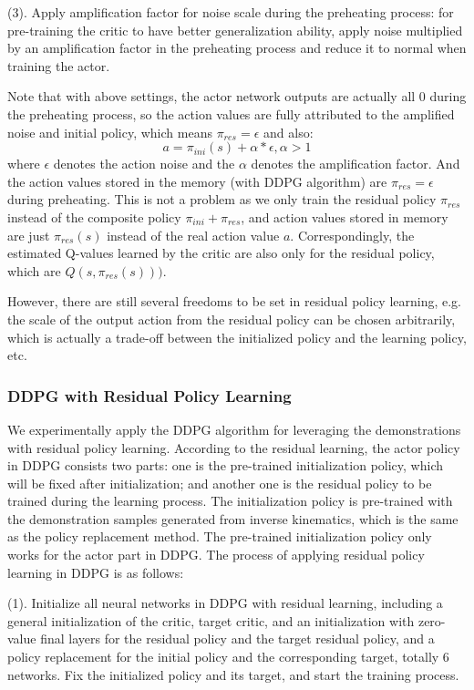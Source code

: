 \documentclass{article}
\begin{document}
(3). Apply amplification factor for noise scale during the preheating process: for pre-training the critic to have better generalization ability, apply noise multiplied by an amplification factor in the preheating process and reduce it to normal when training the actor.

Note that with above settings, the actor network outputs are actually all 0 during the preheating process, so the action values are fully attributed to the amplified noise and initial policy, which means $\pi_{res}=\epsilon$ and also:
\begin{equation}
a=\pi_{ini}(s)+\alpha * \epsilon, \alpha>1
\end{equation}
where $\epsilon$ denotes the action noise and the $\alpha$ denotes the amplification factor. And the action values stored in the memory (with DDPG algorithm) are $\pi_{res}=\epsilon$ during preheating. This is not a problem as we only train the residual policy $\pi_{res}$ instead of the composite policy $\pi_{ini}+\pi_{res}$, and action values stored in memory are just $\pi_{res}(s)$ instead of the real action value $a$. Correspondingly, the estimated Q-values learned by the critic are also only for the residual policy, which are $Q(s, \pi_{res}(s)))$.

However, there are still several freedoms to be set in residual policy learning, e.g. the scale of the output action from the residual policy can be chosen arbitrarily, which is actually a trade-off between the initialized policy and the learning policy, etc.

\subsubsection{DDPG with Residual Policy Learning}
We experimentally apply the DDPG algorithm for leveraging the demonstrations with residual policy learning. According to the residual learning, the actor policy in DDPG consists two parts: one is the pre-trained initialization policy, which will be fixed after initialization; and another one is the residual policy to be trained during the learning process. The initialization policy is pre-trained with the demonstration samples generated from inverse kinematics, which is the same as the policy replacement method. The pre-trained initialization policy only works for the actor part in DDPG. The process of applying residual policy learning in DDPG is as follows:

(1). Initialize all neural networks in DDPG with residual learning, including a general initialization of the critic, target critic, and an initialization with zero-value final layers for the residual policy and the target residual policy, and a policy replacement for the initial policy and the corresponding target, totally 6 networks. Fix the initialized policy and its target, and start the training process.
\end{document}
